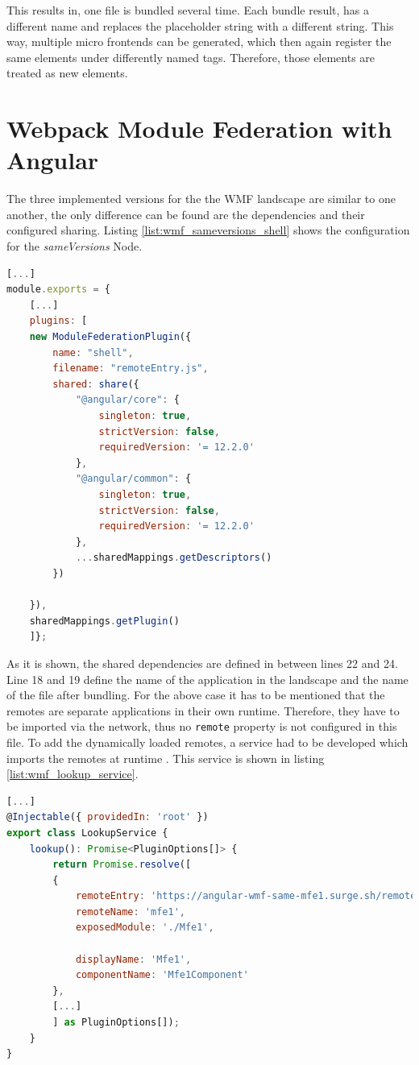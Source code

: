 This results in, one file is bundled several time. Each bundle result, has a different name and replaces the placeholder string with a different string. This way, multiple micro frontends can be generated, which then again register the same elements under differently named tags. Therefore, those elements are treated as new elements.

\section{Webpack Module Federation with Angular} 
\label{wmf_implementation_prototype}

The three implemented versions for the the WMF landscape are similar to one another, the only difference can be found are the dependencies and their configured sharing. Listing \ref{list:wmf_sameversions_shell} shows the configuration for the \textit{sameVersions} Node.

\begin{lstlisting}[language=JavaScript, caption=Content of \texttt{webpack.config.js} of the shell of the sameVersions WMF project, label=list:wmf_sameversions_shell, xleftmargin=.0\textwidth, xrightmargin=.0\textwidth]
[...]
module.exports = {
	[...]
	plugins: [
	new ModuleFederationPlugin({
		name: "shell",
		filename: "remoteEntry.js",
		shared: share({
			"@angular/core": { 
				singleton: true, 
				strictVersion: false, 
				requiredVersion: '= 12.2.0'
			},
			"@angular/common": { 
				singleton: true, 
				strictVersion: false, 
				requiredVersion: '= 12.2.0' 
			},
			...sharedMappings.getDescriptors()
		})
		
	}),
	sharedMappings.getPlugin()
	]};
\end{lstlisting}

As it is shown, the shared dependencies are defined in between lines 22 and 24. Line 18 and 19 define the name of the application in the landscape and the name of the file after bundling. For the above case it has to be mentioned that the remotes are separate applications in their own runtime. Therefore, they have to be imported via the network, thus no \texttt{remote} property is not configured in this file. To add the dynamically loaded remotes, a service had to be developed which imports the remotes at runtime \cite{wmf_angular_dynamicfederation}. This service is shown in listing \ref{list:wmf_lookup_service}.

\begin{lstlisting}[language=JavaScript, caption=Content of \texttt{lookup.service.ts} for remote module loading in shell applications, label=list:wmf_lookup_service,  xleftmargin=.0\textwidth, xrightmargin=.0\textwidth]
[...]
@Injectable({ providedIn: 'root' })
export class LookupService {
	lookup(): Promise<PluginOptions[]> {
		return Promise.resolve([
		{
			remoteEntry: 'https://angular-wmf-same-mfe1.surge.sh/remoteEntry.js',
			remoteName: 'mfe1',
			exposedModule: './Mfe1',
			
			displayName: 'Mfe1',
			componentName: 'Mfe1Component'
		},
		[...]	
		] as PluginOptions[]);
	}
}
\end{lstlisting}

